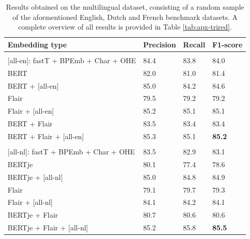 \documentclass[12pt,a4paper,]{book}
\begin{document}
\begin{table}

\caption{\label{tab:benchmark-multi-tab}Results obtained on the multilingual dataset, consisting of a random sample of the aformentioned English, Dutch and French benchmark datasets. A complete overview of all results is provided in Table \ref{tab:apx-trired}.}
\centering
\begin{tabular}[t]{llll}
\toprule
Embedding type & Precision & Recall & F1-score\\
\midrule
\addlinespace[0.3em]
\multicolumn{4}{l}{\textbf{Monolingual English embeddings}}\\
\hspace{1em}[all-en]: fastT + BPEmb + Char + OHE & 84.4 & 83.8 & 84.0\\
\hspace{1em}BERT & 82.0 & 81.0 & 81.4\\
\hspace{1em}BERT + [all-en] & 85.0 & 84.2 & 84.6\\
\hspace{1em}Flair & 79.5 & 79.2 & 79.2\\
\hspace{1em}Flair + [all-en] & 85.2 & 85.1 & 85.1\\
\hspace{1em}BERT + Flair & 83.5 & 83.4 & 83.4\\
\hspace{1em}BERT + Flair + [all-en] & 85.3 & 85.1 & \textbf{85.2}\\
\addlinespace[0.3em]
\multicolumn{4}{l}{\textbf{Monolingual Dutch embeddings}}\\
\hspace{1em}[all-nl]: fastT + BPEmb + Char + OHE & 83.5 & 82.9 & 83.1\\
\hspace{1em}BERTje & 80.1 & 77.4 & 78.6\\
\hspace{1em}BERTje + [all-nl] & 85.0 & 84.8 & 84.9\\
\hspace{1em}Flair & 79.1 & 79.7 & 79.3\\
\hspace{1em}Flair + [all-nl] & 84.1 & 84.2 & 84.1\\
\hspace{1em}BERTje + Flair & 80.7 & 80.6 & 80.6\\
\hspace{1em}BERTje + Flair + [all-nl] & 85.2 & 85.8 & \textbf{85.5}\\

\end{tabular}
\end{table}
\end{document}
